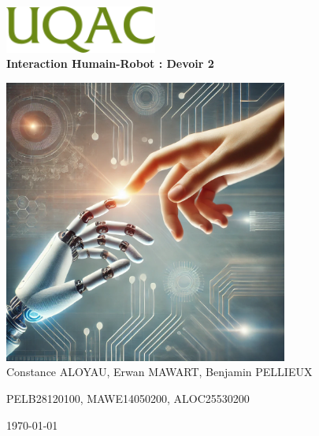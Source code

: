 \documentclass[a4paper,11pt]{article}
\begin{document}

\begin{titlepage}
    \begin{center}
        \includegraphics[width=5cm]{./img/uqac.png}\\[1cm]
        
        \vspace*{1cm} %
        {\Huge \textbf{Interaction Humain-Robot : Devoir 2}\\[0.5cm]}

        \vspace*{1cm}
        \includegraphics[width=0.7\textwidth]{./img/image_IHR.png}\\[1cm]

        
        
        \vspace{2cm}
        {\LARGE Constance ALOYAU, Erwan MAWART, Benjamin PELLIEUX}
        
        \vspace{0.5cm}
        {\large PELB28120100, MAWE14050200, ALOC25530200}
        
        \vspace{2cm}
        {\Large \today}
        
        \vfill
    \end{center}
\end{titlepage}
\end{document}
